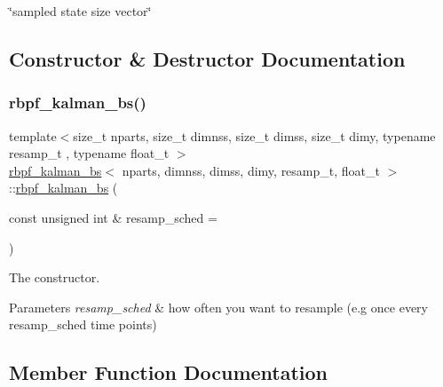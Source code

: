 \char`\"{}sampled state size vector\char`\"{} 

\subsection{Constructor \& Destructor Documentation}
\mbox{\label{classrbpf__kalman__bs_afbd99010c2198c6153bfaf9f11a50299}} 
\subsubsection{\texorpdfstring{rbpf\+\_\+kalman\+\_\+bs()}{rbpf\_kalman\_bs()}}
{\footnotesize\ttfamily template$<$size\+\_\+t nparts, size\+\_\+t dimnss, size\+\_\+t dimss, size\+\_\+t dimy, typename resamp\+\_\+t , typename float\+\_\+t $>$ \\
\hyperlink{classrbpf__kalman__bs}{rbpf\+\_\+kalman\+\_\+bs}$<$ nparts, dimnss, dimss, dimy, resamp\+\_\+t, float\+\_\+t $>$\+::\hyperlink{classrbpf__kalman__bs}{rbpf\+\_\+kalman\+\_\+bs} (\begin{DoxyParamCaption}\item[{const unsigned int \&}]{resamp\+\_\+sched = {} }\end{DoxyParamCaption})}



The constructor. 


\begin{DoxyParams}{Parameters}
{\em resamp\+\_\+sched} & how often you want to resample (e.\+g once every resamp\+\_\+sched time points) \\
\hline
\end{DoxyParams}


\subsection{Member Function Documentation}
\mbox{\label{classrbpf__kalman__bs_a241e90ba673be5398f17eccc52b727bf}} 
